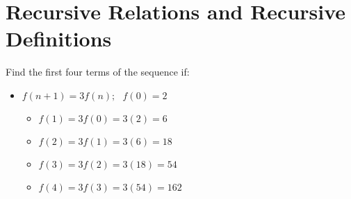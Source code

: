 \section{Recursive Relations and Recursive Definitions}

\begin{problem}
    Find the first four terms of the sequence if:

    \begin{itemize}
        \item $f(n+1) = 3f(n);\:\:\:f(0)=2$
        \begin{itemize}
            \item $f(1)=3f(0)=3(2)=6$
            \item $f(2)=3f(1)=3(6)=18$
            \item $f(3)=3f(2)=3(18)=54$
            \item $f(4) = 3f(3)= 3(54) = 162$
        \end{itemize}
    \end{itemize}
\end{problem}

